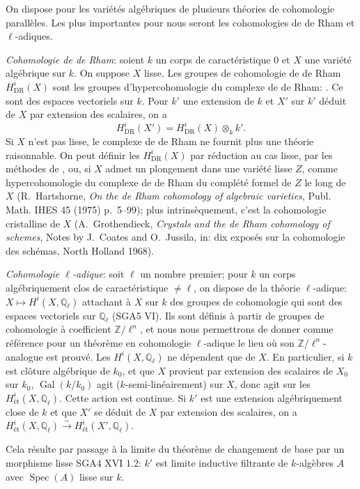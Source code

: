 \documentclass[12pt,a4paper]{article}
\theoremstyle{plain}
\theoremstyle{definition}
\theoremstyle{remark}
\DeclareMathOperator{\Spec}{Spec}
\DeclareMathOperator{\Gal}{Gal}
\providecommand{\Gal}{\operatorname{Gal}}
\providecommand{\Spec}{\operatorname{Spec}}
\providecommand{\DR}{\mathrm{DR}}
\begin{document}
On dispose pour les vari\'et\'es alg\'ebriques de plusieurs th\'eories de cohomologie
parall\`eles. Les plus importantes pour nous seront les cohomologies de de Rham et
$\ell$-adiques.

\emph{Cohomologie de de Rham}: soient $k$ un corps de caract\'eristique $0$ et $X$ une
vari\'et\'e alg\'ebrique sur $k$. On suppose $X$ lisse. Les groupes de cohomologie de de
Rham $H^i_{\DR}(X)$ sont les groupes d'hypercohomologie du complexe de de Rham:
\cite{G}. Ce sont des espaces vectoriels sur $k$. Pour $k'$ une extension de $k$ et $X'$
sur $k'$ d\'eduit de $X$ par extension des scalaires, on a
\[
H^i_{\DR}(X') = H^i_{\DR}(X) \otimes_k k'.
\]
Si $X$ n'est pas lisse, le complexe de de Rham ne fournit plus une th\'eorie raisonnable.
On peut d\'efinir les $H^i_{\DR}(X)$ par r\'eduction au cas lisse, par les m\'ethodes de
\cite{D3}, ou, si $X$ admet un plongement dans une vari\'et\'e lisse $Z$, comme
hypercohomologie du complexe de de Rham du compl\'et\'e formel de $Z$ le long de $X$
(R.~Hartshorne, \textit{On the de Rham cohomology of algebraic varieties}, Publ. Math.
IHES 45 (1975) p.~5--99); plus intrins\`equement, c'est la cohomologie cristalline de $X$
(A.~Grothendieck, \textit{Crystals and the de Rham cohomology of schemes}, Notes by
J.~Coates and O.~Jussila, in: dix expos\'es sur la cohomologie des sch\'emas, North
Holland 1968).

\emph{Cohomologie $\ell$-adique}: soit $\ell$ un nombre premier; pour $k$ un corps
alg\'ebriquement clos de caract\'eristique $\neq \ell$, on dispose de la th\'eorie
$\ell$-adique: $X \mapsto H^i(X, \mathbb{Q}_\ell)$ attachant \`a $X$ sur $k$ des groupes de
cohomologie qui sont des espaces vectoriels sur $\mathbb{Q}_\ell$ (SGA5 VI). Ils sont
d\'efinis \`a partir de groupes de cohomologie \`a coefficient $\mathbb{Z}/\ell^n$, et nous nous
permettrons de donner comme r\'ef\'erence pour un th\'eor\`eme en cohomologie
$\ell$-adique le lieu o\`u son $\mathbb{Z}/\ell^n$-analogue est prouv\'e. Les $H^i(X,\mathbb{Q}_\ell)$
ne d\'ependent que de $X$. En particulier, si $k$ est cl\^oture alg\'ebrique de $k_0$, et
que $X$ provient par extension des scalaires de $X_0$ sur $k_0$, $\Gal(k/k_0)$ agit
($k$-semi-lin\'eairement) sur $X$, donc agit sur les $H^i_\text{\'et}(X, \mathbb{Q}_\ell)$.
Cette action est continue. Si $k'$ est une extension alg\'ebriquement close de $k$ et que
$X'$ se d\'eduit de $X$ par extension des scalaires, on a
$H^i_\text{\'et}(X, \mathbb{Q}_\ell) \xrightarrow{\sim} H^i_\text{\'et}(X', \mathbb{Q}_\ell)$.

Cela r\'esulte par passage \`a la limite du th\'eor\`eme de changement de base par un
morphisme lisse SGA4 XVI 1.2: $k'$ est limite inductive filtrante de $k$-alg\`ebres $A$
avec $\Spec(A)$ lisse sur $k$.
\end{document}
